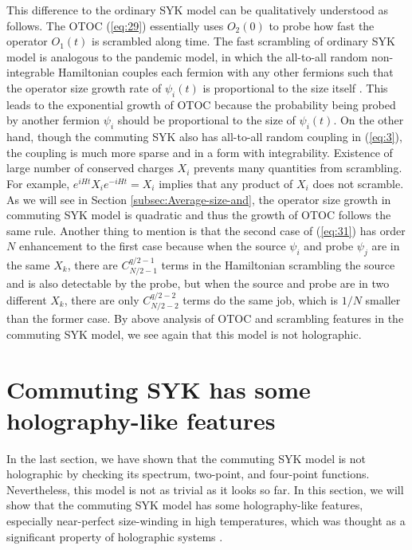 \documentclass[11pt]{article}
\renewcommand{\>}{\rangle}
\newcommand{\<}{\langle}
\begin{document}
This difference to the ordinary SYK model can be qualitatively understood
as follows. The OTOC (\ref{eq:29}) essentially uses $O_{2}(0)$ to
probe how fast the operator $O_{1}(t)$ is scrambled along time. The
fast scrambling of ordinary SYK model is analogous to the pandemic
model, in which the all-to-all random non-integrable Hamiltonian couples
each fermion with any other fermions such that the operator size growth
rate of $\psi_{i}(t)$ is proportional to the size itself \cite{Roberts:2018mnp, Qi:2018bje}.
This leads to the exponential growth of OTOC because the probability
being probed by another fermion $\psi_{i}$ should be proportional
to the size of $\psi_{i}(t)$. On the other hand, though the commuting
SYK also has all-to-all random coupling in (\ref{eq:3}), the coupling
is much more sparse and in a form with integrability. Existence of
large number of conserved charges $X_{i}$ prevents many quantities
from scrambling. For example, $e^{iHt}X_{i}e^{-iHt}=X_{i}$ implies
that any product of $X_{i}$ does not scramble. As we will see in
Section \ref{subsec:Average-size-and}, the operator size growth in
commuting SYK model is quadratic and thus the growth of OTOC follows
the same rule. Another thing to mention is that the second case of
(\ref{eq:31}) has order $N$ enhancement to the first case because
when the source $\psi_{i}$ and probe $\psi_{j}$ are in the same
$X_{k}$, there are $C_{N/2-1}^{q/2-1}$ terms in the Hamiltonian
scrambling the source and is also detectable by the probe, but when the
source and probe are in two different $X_{k}$, there are only $C_{N/2-2}^{q/2-2}$
terms do the same job, which is $1/N$ smaller than the former case.
By above analysis of OTOC and scrambling features in the commuting
SYK model, we see again that this model is not holographic. 

\section{Commuting SYK has some holography-like features\label{sec:Commuting-SYK-has}}

In the last section, we have shown that the commuting SYK model is
not holographic by checking its spectrum, two-point, and four-point
functions. Nevertheless, this model is not as trivial as it looks
so far. In this section, we will show that the commuting SYK
model has some holography-like features, especially near-perfect size-winding
in high temperatures, which was thought as a significant property of
holographic systems \cite{Brown:2019hmk, Nezami:2021yaq}. 
\end{document}
